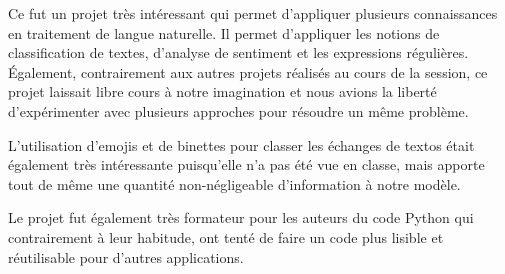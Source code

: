Ce fut un projet très intéressant qui permet d'appliquer plusieurs connaissances en traitement de langue naturelle. Il permet d'appliquer les notions de classification de textes, d'analyse de sentiment et les expressions régulières.
Également, contrairement aux autres projets réalisés au cours de la session, ce projet laissait libre cours à notre imagination et nous avions la liberté d'expérimenter avec plusieurs approches pour résoudre un même problème.

L'utilisation d'emojis et de binettes pour classer les échanges de textos était également très intéressante puisqu'elle n'a pas été vue en classe, mais apporte tout de même une quantité non-négligeable d'information à notre modèle.

Le projet fut également très formateur pour les auteurs du code Python qui contrairement à leur habitude, ont tenté de faire un code plus lisible et réutilisable pour d'autres applications. 
